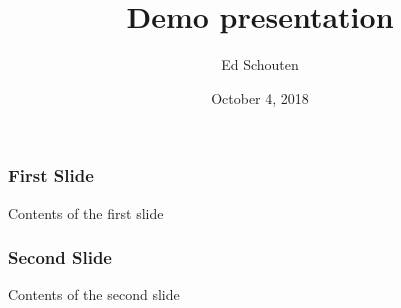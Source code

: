 \documentclass{beamer}
\title{Demo presentation}
\author{Ed Schouten}
\date{October 4, 2018}
\begin{document}
\maketitle
\begin{frame}
\frametitle{First Slide}
Contents of the first slide
\end{frame}
\begin{frame}
\frametitle{Second Slide}
Contents of the second slide
\end{frame}
\end{document}
